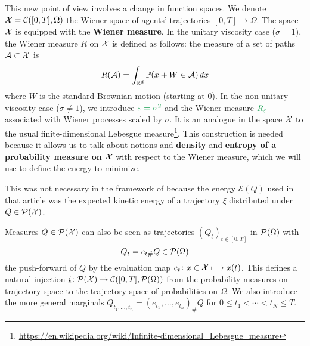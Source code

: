 \documentclass[../report.tex]{subfiles}
\begin{document}
This new point of view involves a change in function spaces. We denote $\mathcal{X} = \mathcal{C}([0,T], \Omega)$ the Wiener space of agents' trajectories $[0,T] \to\Omega$. The space $\mathcal{X}$ is equipped with the \textbf{\bluefont Wiener measure}.
In the unitary viscosity case ($\sigma = 1$), the Wiener measure $R$ on $\mathcal{X}$ is defined as follows: the measure of a set of paths $\mathcal{A} \subset \mathcal{X}$ is
\[
	R(\mathcal{A}) = \int_{\mathbb{R}^d}\mathbb{P}(x+W \in \mathcal{A})\, dx
\]
where $W$ is the standard Brownian motion (starting at $0$).
In the non-unitary viscosity case ($\sigma \neq 1$), we introduce $\greenfont\epsilon = \sigma^2$ and the Wiener measure $\greenfont R_\epsilon$ associated with Wiener processes scaled by $\sigma$.
It is an analogue in the space $\mathcal{X}$ to the usual finite-dimensional Lebesgue measure\footnote{\url{https://en.wikipedia.org/wiki/Infinite-dimensional_Lebesgue_measure}}. \cites{benamou:hal-01295299,benamou2015lagrangian} This construction is needed because it allows us to talk about notions and \textbf{density} and \textbf{entropy of a probability measure on $\mathcal{X}$} with respect to the Wiener measure, which we will use to define the energy to minimize.

\begin{remark}
	This was not necessary in the framework of \cite{benamou:hal-01295299} because the energy $\mathcal{E}(Q)$ used in that article was the expected kinetic energy of a trajectory $\xi$ distributed under $Q\in\mathcal{P}(\mathcal{X})$.
\end{remark}



Measures $Q \in \mathcal{P}(\mathcal{X})$ can also be seen as trajectories $(Q_t)_{t\in[0,T]}$ in $\mathcal{P}(\Omega)$ with
\[
Q_t = e_{t\#}Q \in \mathcal{P}(\Omega)
\]
the push-forward of $Q$ by the evaluation map $e_t\colon x\in\mathcal{X}\longmapsto x(t)$. This defines a natural injection $\underline{i} \colon \mathcal{P}(\mathcal{X}) \rightarrow \mathcal{C}([0,T], \mathcal{P}(\Omega))$ from the probability measures on trajectory space to the trajectory space of probabilities on $\Omega$. We also introduce the more general marginals $Q_{t_1,\ldots,t_n} = (e_{t_1},\ldots, e_{t_n})_\# Q$ for $0\leq t_1 < \cdots < t_N \leq T$.
\end{document}
